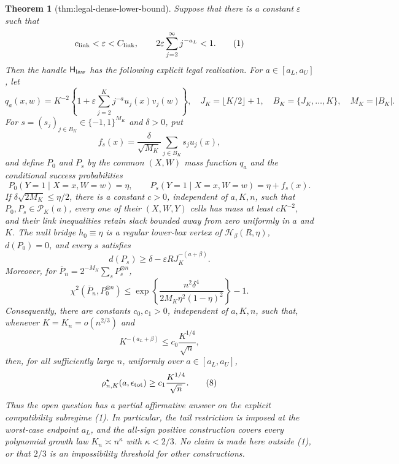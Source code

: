 \documentclass{article}
\newtheorem{theorem}{Theorem}
\begin{document}
\begin{theorem}[thm:legal-dense-lower-bound]\label{thm:legal-dense-lower-bound}
Suppose that there is a constant \(\varepsilon\) such that
\[
c_{\rm link}<\varepsilon<C_{\rm link},
\qquad
2\varepsilon\sum_{j=2}^{\infty}j^{-a_L}<1.
\tag{1}
\]
Then the handle \(\mathsf H_{\rm law}\) has the following explicit legal realization.  For \(a\in[a_L,a_U]\), let
\[
q_a(x,w)=K^{-2}\left\{1+\varepsilon\sum_{j=2}^Kj^{-a}u_j(x)v_j(w)\right\},
\quad
J_K=\lfloor K/2\rfloor+1,
\quad
B_K=\{J_K,\ldots,K\},
\quad
M_K=|B_K|.
\tag{2}
\]
For \(s=(s_j)_{j\in B_K}\in\{-1,1\}^{M_K}\) and \(\delta>0\), put
\[
f_s(x)=\frac{\delta}{\sqrt{M_K}}\sum_{j\in B_K}s_ju_j(x),
\tag{3}
\]
and define \(P_0\) and \(P_s\) by the common \((X,W)\) mass function \(q_a\) and the conditional success probabilities
\[
P_0(Y=1\mid X=x,W=w)=\eta,
\qquad
P_s(Y=1\mid X=x,W=w)=\eta+f_s(x).
\tag{4}
\]
If \(\delta\sqrt{2M_K}\le \eta/2\), there is a constant \(c>0\), independent of \(a,K,n\), such that \(P_0,P_s\in\mathcal P_K(a)\), every one of their \((X,W,Y)\) cells has mass at least \(cK^{-2}\), and their link inequalities retain slack bounded away from zero uniformly in \(a\) and \(K\).  The null bridge \(h_0\equiv\eta\) is a regular lower-box vertex of \(\mathcal H_\beta(R,\eta)\), \(d(P_0)=0\), and every \(s\) satisfies
\[
d(P_s)\ge \delta-\varepsilon R J_K^{-(a+\beta)}.
\tag{5}
\]
Moreover, for \(\overline P_n=2^{-M_K}\sum_sP_s^{\otimes n}\),
\[
\chi^2\!\left(\overline P_n,P_0^{\otimes n}\right)
\le
\exp\!\left\{\frac{n^2\delta^4}{2M_K\eta^2(1-\eta)^2}\right\}-1.
\tag{6}
\]
Consequently, there are constants \(c_0,c_1>0\), independent of \(a,K,n\), such that, whenever \(K=K_n=o(n^{2/3})\) and
\[
K^{-(a_L+\beta)}\le c_0\frac{K^{1/4}}{\sqrt n},
\tag{7}
\]
then, for all sufficiently large \(n\), uniformly over \(a\in[a_L,a_U]\),
\[
\rho^\star_{n,K}(a,\epsilon_{\rm tot})
\ge c_1\frac{K^{1/4}}{\sqrt n}.
\tag{8}
\]
Thus the open question has a partial affirmative answer on the explicit compatibility subregime (1).  In particular, the tail restriction is imposed at the worst-case endpoint \(a_L\), and the all-sign positive construction covers every polynomial growth law \(K_n\asymp n^\kappa\) with \(\kappa<2/3\).  No claim is made here outside (1), or that \(2/3\) is an impossibility threshold for other constructions.
\end{theorem}
\end{document}
